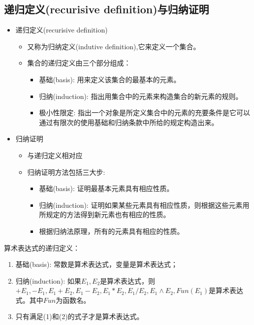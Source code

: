 \subsection{递归定义(recurisive definition)与归纳证明}
\begin{itemize}
	\item 递归定义(recurisive definition)
	\begin{itemize}
		\item 又称为归纳定义(indutive definition),它来定义一个集合。
		\item 集合的递归定义由三个部分组成：
		\begin{itemize}
			\item 基础(basis): 用来定义该集合的最基本的元素。
			\item 归纳(induction): 指出用集合中的元素来构造集合的新元素的规则。
			\item 极小性限定: 指出一个对象是所定义集合中的元素的充要条件是它可以通过有限次的使用基础和归纳条款中所给的规定构造出来。
		\end{itemize}
	\end{itemize}
    \item 归纳证明
    \begin{itemize}
    	\item 与递归定义相对应
    	\item 归纳证明方法包括三大步:
    	\begin{itemize}
    		\item 基础(basis): 证明最基本元素具有相应性质。
    		\item 归纳(induction): 证明如果某些元素具有相应性质，则根据这些元素用所规定的方法得到新元素也有相应的性质。
    		\item 根据归纳法原理，所有的元素具有相应的性质。
    	\end{itemize}
    \end{itemize}
\end{itemize}

\begin{example} \label{exr} 算术表达式的递归定义：
	\begin{enumerate}
		\item 基础(basis): 常数是算术表达式，变量是算术表达式；
		\item 归纳(induction): 如果$E_1,E_2$是算术表达式，则$+E_1,-E_1,E_1+E_2,E_1-E_2,E_1\ast E_2,E_1/E_2,E_1\land {E_2},Fun(E_1)$是算术表达式。其中$Fun$为函数名。
		\item 只有满足(1)和(2)的式子才是算术表达式。
	\end{enumerate}
\end{example}

